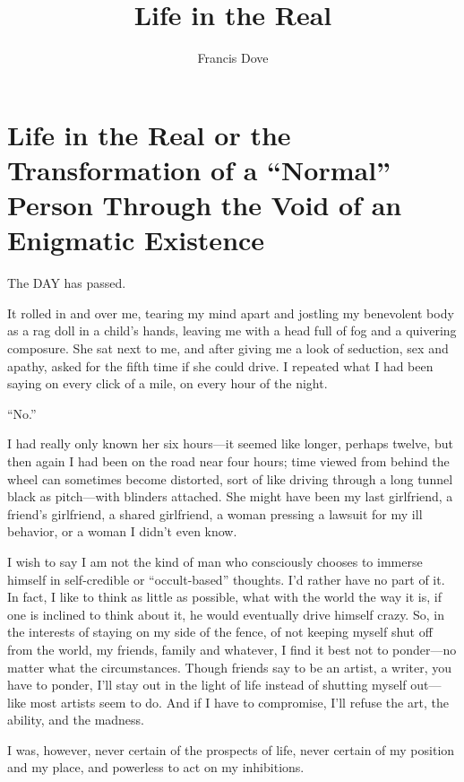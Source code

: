 \documentclass[
]{article}
\title{Life in the Real}
\author{Francis Dove}
\date{}
\begin{document}
\maketitle

\section{Life in the Real or the Transformation of a ``Normal'' Person
Through the Void of an Enigmatic
Existence}\label{life-in-the-real-or-the-transformation-of-a-normal-person-through-the-void-of-an-enigmatic-existence}

The DAY has passed.

It rolled in and over me, tearing my mind apart and jostling my
benevolent body as a rag doll in a child's hands, leaving me with a head
full of fog and a quivering composure. She sat next to me, and after
giving me a look of seduction, sex and apathy, asked for the fifth time
if she could drive. I repeated what I had been saying on every click of
a mile, on every hour of the night.

``No.''

I had really only known her six hours---it seemed like longer, perhaps
twelve, but then again I had been on the road near four hours; time
viewed from behind the wheel can sometimes become distorted, sort of
like driving through a long tunnel black as pitch---with blinders
attached. She might have been my last girlfriend, a friend's girlfriend,
a shared girlfriend, a woman pressing a lawsuit for my ill behavior, or
a woman I didn't even know.

I wish to say I am not the kind of man who consciously chooses to
immerse himself in self-credible or ``occult-based'' thoughts. I'd
rather have no part of it. In fact, I like to think as little as
possible, what with the world the way it is, if one is inclined to think
about it, he would eventually drive himself crazy. So, in the interests
of staying on my side of the fence, of not keeping myself shut off from
the world, my friends, family and whatever, I find it best not to
ponder---no matter what the circumstances. Though friends say to be an
artist, a writer, you have to ponder, I'll stay out in the light of life
instead of shutting myself out---like most artists seem to do. And if I
have to compromise, I'll refuse the art, the ability, and the madness.

I was, however, never certain of the prospects of life, never certain of
my position and my place, and powerless to act on my inhibitions.
\end{document}

